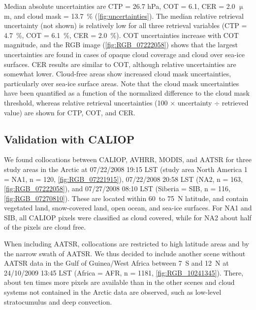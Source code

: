 Median absolute uncertainties are CTP = 26.7 hPa, COT = 6.1, CER = 2.0 $\upmu$m, and cloud mask = 13.7~\% (\cref{fig:uncertainties}). The median relative retrieval uncertainty (not shown) is relatively low for all three retrieval variables (CTP = 4.7~\%, COT = 6.1~\%, CER = 2.0~\%). COT uncertainties increase with COT magnitude, and the RGB image (\cref{fig:RGB_07222058}) shows that the largest uncertainties are found in cases of opaque cloud coverage and cloud over sea-ice surfaces. CER results are similar to COT, although relative uncertainties are somewhat lower. Cloud-free areas show increased cloud mask uncertainties, particularly over sea-ice surface areas. Note that the cloud mask uncertainties have been quantified as a function of the normalized difference to the cloud mask threshold, whereas relative retrieval uncertainties (100 $\times$ uncertainty $\div$ retrieved value) are shown for CTP, COT, and CER. 

\subsection{Validation with CALIOP}

We found collocations between CALIOP, AVHRR, MODIS, and AATSR for three study areas in the Arctic at 07/22/2008 19:15 LST (study area North America 1 = NA1, n = 120, \cref{fig:RGB_07221915}), 07/22/2008 20:58 LST (NA2, n = 163, \cref{fig:RGB_07222058}), and 07/27/2008 08:10 LST (Siberia = SIB, n = 116, \cref{fig:RGB_07270810}). These are located within 60\textdegree\ to 75\textdegree\ N latitude, and contain vegetated land, snow-covered land, open ocean, and sea-ice surfaces. For NA1 and SIB, all CALIOP pixels were classified as cloud covered, while for NA2 about half of the pixels are cloud free.

When including AATSR, collocations are restricted to high latitude areas and by the narrow swath of AATSR. We thus decided to include another scene without AATSR data in the Gulf of Guinea/West Africa between 7\textdegree\ S and 12\textdegree\ N at 24/10/2009 13:45 LST (Africa = AFR, n = 1181, \cref{fig:RGB_10241345}). There, about ten times more pixels are available than in the other scenes and cloud systems not contained in the Arctic data are observed, such as low-level stratocumulus and deep convection.

